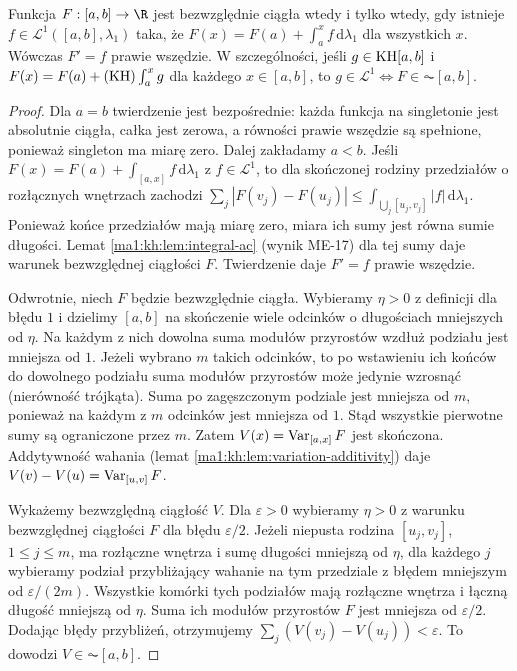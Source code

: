 \begin{twierdzenie}\label{ma1:kh:thm:ac-lebesgue-primitive}\label{it:thm:ac-lebesgue-primitive}
Funkcja $F:[a,b]\to\R$ jest bezwzględnie ciągła wtedy i tylko wtedy, gdy istnieje $f\in\mathcal L^1([a,b],\lambda_1)$ taka, że $F(x)=F(a)+\int_a^x f\,\mathrm d\lambda_1$ dla wszystkich $x$. Wówczas $F'=f$ prawie wszędzie. W szczególności, jeśli $g\in\mathrm{KH}[a,b]$ i $F(x)=F(a)+(\mathrm{KH})\int_a^x g$ dla każdego $x\in[a,b]$, to
$g\in\mathcal L^1\Longleftrightarrow F\in\AC[a,b]$.
\end{twierdzenie}
\begin{proof}
Dla $a=b$ twierdzenie jest bezpośrednie: każda funkcja na singletonie jest absolutnie ciągła, całka jest zerowa, a równości prawie wszędzie są spełnione, ponieważ singleton ma miarę zero. Dalej zakładamy $a<b$. Jeśli $F(x)=F(a)+\int_{[a,x]} f\,\mathrm d\lambda_1$ z $f\in\mathcal L^1$, to dla skończonej rodziny przedziałów o rozłącznych wnętrzach zachodzi
$\sum_j|F(v_j)-F(u_j)|\le\int_{\bigcup_j[u_j,v_j]}|f|\,\mathrm d\lambda_1$. Ponieważ końce przedziałów mają miarę zero, miara ich sumy jest równa sumie długości. Lemat \ref{ma1:kh:lem:integral-ac} (wynik ME-17) dla tej sumy daje warunek bezwzględnej ciągłości $F$. Twierdzenie  daje $F'=f$ prawie wszędzie.

Odwrotnie, niech $F$ będzie bezwzględnie ciągła. Wybieramy $\eta>0$ z definicji dla błędu $1$ i dzielimy $[a,b]$ na skończenie wiele odcinków o długościach mniejszych od $\eta$. Na każdym z nich dowolna suma modułów przyrostów wzdłuż podziału jest mniejsza od $1$. Jeżeli wybrano $m$ takich odcinków, to po wstawieniu ich końców do dowolnego podziału suma modułów przyrostów może jedynie wzrosnąć (nierówność trójkąta). Suma po zagęszczonym podziale jest mniejsza od $m$, ponieważ na każdym z $m$ odcinków jest mniejsza od $1$. Stąd wszystkie pierwotne sumy są ograniczone przez $m$. Zatem $V(x)=\operatorname{Var}_{[a,x]}F$ jest skończona. Addytywność wahania (lemat \ref{ma1:kh:lem:variation-additivity}) daje $V(v)-V(u)=\operatorname{Var}_{[u,v]}F$.

Wykażemy bezwzględną ciągłość $V$. Dla $\varepsilon>0$ wybieramy $\eta>0$ z warunku bezwzględnej ciągłości $F$ dla błędu $\varepsilon/2$. Jeżeli niepusta rodzina $[u_j,v_j]$, $1\le j\le m$, ma rozłączne wnętrza i sumę długości mniejszą od $\eta$, dla każdego $j$ wybieramy podział przybliżający wahanie na tym przedziale z błędem mniejszym od $\varepsilon/(2m)$. Wszystkie komórki tych podziałów mają rozłączne wnętrza i łączną długość mniejszą od $\eta$. Suma ich modułów przyrostów $F$ jest mniejsza od $\varepsilon/2$. Dodając błędy przybliżeń, otrzymujemy $\sum_j(V(v_j)-V(u_j))<\varepsilon$. To dowodzi $V\in\AC[a,b]$.


\end{proof}

